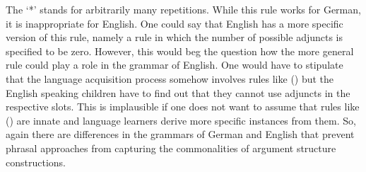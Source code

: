 \ea\label{c-struc-vp-benefactive-resultative-optional-args-adjuncts}
\z
The `*' stands for arbitrarily many repetitions. While this rule works for German, it is
inappropriate for English. One could say that English has a more specific version of this rule,
namely a rule in which the number of possible adjuncts is specified to be zero. However, this would beg the
question how the more general rule could play a role in the grammar of English. One would have to
stipulate that the language acquisition process somehow involves rules like () but the
English speaking children have to find out that they cannot use adjuncts in the respective
slots. This is implausible if one does not want to assume that rules like () are innate and
language learners derive more specific instances from them. So, again there are differences in the
grammars of German and English that prevent phrasal approaches from capturing the commonalities of
argument structure constructions.




